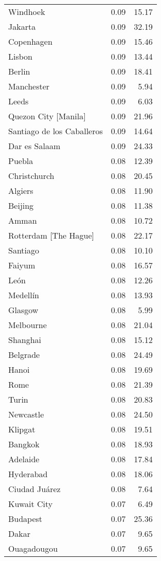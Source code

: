 \begin{longtable}{lrr}
  Windhoek & 0.09 & 15.17 \\ 
  Jakarta & 0.09 & 32.19 \\ 
  Copenhagen & 0.09 & 15.46 \\ 
  Lisbon & 0.09 & 13.44 \\ 
  Berlin & 0.09 & 18.41 \\ 
  Manchester & 0.09 & 5.94 \\ 
  Leeds & 0.09 & 6.03 \\ 
  Quezon City [Manila] & 0.09 & 21.96 \\ 
  Santiago de los Caballeros & 0.09 & 14.64 \\ 
  Dar es Salaam & 0.09 & 24.33 \\ 
  Puebla & 0.08 & 12.39 \\ 
  Christchurch & 0.08 & 20.45 \\ 
  Algiers & 0.08 & 11.90 \\ 
  Beijing & 0.08 & 11.38 \\ 
  Amman & 0.08 & 10.72 \\ 
  Rotterdam [The Hague] & 0.08 & 22.17 \\ 
  Santiago & 0.08 & 10.10 \\ 
  Faiyum & 0.08 & 16.57 \\ 
  León & 0.08 & 12.26 \\ 
  Medellín & 0.08 & 13.93 \\ 
  Glasgow & 0.08 & 5.99 \\ 
  Melbourne & 0.08 & 21.04 \\ 
  Shanghai & 0.08 & 15.12 \\ 
  Belgrade & 0.08 & 24.49 \\ 
  Hanoi & 0.08 & 19.69 \\ 
  Rome & 0.08 & 21.39 \\ 
  Turin & 0.08 & 20.83 \\ 
  Newcastle & 0.08 & 24.50 \\ 
  Klipgat & 0.08 & 19.51 \\ 
  Bangkok & 0.08 & 18.93 \\ 
  Adelaide & 0.08 & 17.84 \\ 
  Hyderabad & 0.08 & 18.06 \\ 
  Ciudad Juárez & 0.08 & 7.64 \\ 
  Kuwait City & 0.07 & 6.49 \\ 
  Budapest & 0.07 & 25.36 \\ 
  Dakar & 0.07 & 9.65 \\ 
  Ouagadougou & 0.07 & 9.65 \\ 

\end{longtable}
